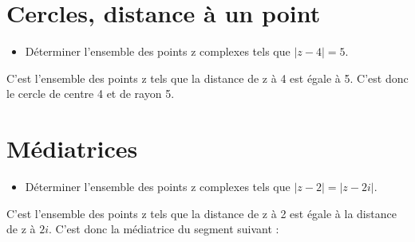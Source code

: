 \documentclass[a4paper,12pt]{article}
\begin{document}
    \section{Cercles, distance à un point}
    \begin{itemize}
        \item Déterminer l'ensemble des points z complexes tels que $|z - 4| = 5$.
    \end{itemize}
    C'est l'ensemble des points z tels que la distance de z à 4 est égale à 5.
    C'est donc le cercle de centre 4 et de rayon 5.

    \begin{center}
    \end{center}

    \section{Médiatrices}
    \begin{itemize}
        \item Déterminer l'ensemble des points z complexes tels que $|z - 2| = |z - 2i|$.
    \end{itemize}
    C'est l'ensemble des points z tels que la distance de z à 2 est égale à la distance de z à $2i$.
    C'est donc la médiatrice du segment suivant :
\end{document}
